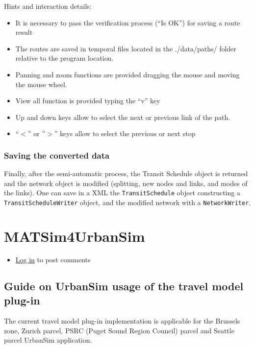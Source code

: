 \documentclass[a4paper,11pt]{report}
\begin{document}
Hints and interaction details:
\begin{itemize}
	\item It is necessary to pass the verification process (“Is OK”) for saving a route result
	\item The routes are saved in temporal files located in the ./data/paths/ folder relative to the program location.
	\item Panning and zoom functions are provided dragging the mouse and moving the mouse wheel.
	\item View all function is provided typing the “v” key
	\item Up and down keys allow to select the next or previous link of the path.
	\item “$<$” or ”$>$” keys allow to select the previous or next stop 


\end{itemize}

\subsubsection{Saving the converted data}

Finally, after the semi-automatic process, the Transit Schedule  object is returned and the network object is modified (splitting, new  nodes and links, and modes of the links). One can save in a XML  the 
\texttt{TransitSchedule} object constructing a 
\texttt{TransitScheduleWriter} object, and the modified network with a 
\texttt{NetworkWriter}.

\vfill\eject
\section{MATSim4UrbanSim}
\begin{itemize}
	\item \href{http://www.matsim.org/user/login?destination=comment/reply/680%23comment-form}{Log in} to post comments
\end{itemize}

\subsection{Guide on UrbanSim usage of the travel model plug-in}

The current travel model plug-in implementation is applicable for the  Brussels zone, Zurich parcel, PSRC (Puget Sound Region Council) parcel  and Seattle parcel UrbanSim application.
\end{document}
